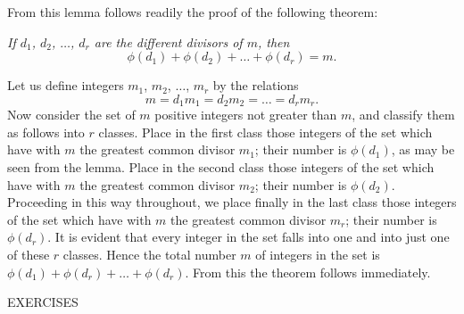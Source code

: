\documentclass[oneside]{book}
\begin{document}
From this lemma follows readily the proof of the following theorem:

\smallskip \emph{If $d_1$, $d_2$, $\ldots$, $d_r$ are the different
divisors of $m$, then}
\begin{equation*}
\phi(d_1) + \phi(d_2) + \ldots + \phi(d_r) = m.
\end{equation*}

Let us define integers $m_1$, $m_2$, $\ldots$, $m_r$ by the
relations
\begin{equation*}
m = d_1 m_1 = d_2 m_2 = \ldots = d_r m_r.
\end{equation*}
Now consider the set of $m$ positive integers not greater than $m$,
and classify them as follows into $r$ classes. Place in the first
class those integers of the set which have with $m$ the greatest
common divisor $m_1$; their number is $\phi(d_1)$, as may be seen
from the lemma. Place in the second class those integers of the set
which have with $m$ the greatest common divisor $m_2$; their number
is $\phi(d_2)$. Proceeding in this way throughout, we place finally
in the last class those integers of the set which have with $m$ the
greatest common divisor $m_r$; their number is $\phi(d_r)$. It is
evident that every integer in the set falls into one and into just
one of these $r$ classes. Hence the total number $m$ of integers in
the set is $\phi(d_1) + \phi(d_r) + \ldots + \phi(d_r)$. From this
the theorem follows immediately.

\begin{center}
EXERCISES
\end{center}
\end{document}
